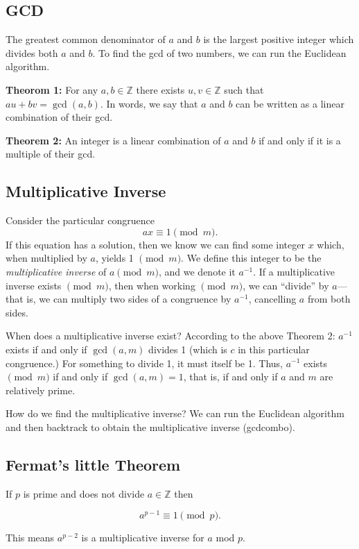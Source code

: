 \documentclass[12pt,letterpaper]{article}
\newcommand\Z{\mathbb Z}
\begin{document}
\subsection{GCD}

The greatest common denominator of $a$ and $b$ is the largest positive integer which divides both $a$ and $b$. To find the gcd of two numbers, we can run the Euclidean algorithm.

\textbf{Theorom 1:} For any $a,b \in \Z$ there exists $u,v \in \Z$ such that $au + bv = \gcd(a,b)$. In words, we say that $a$ and $b$ can be written as a linear combination of their gcd.

\textbf{Theorem 2:} An integer is a linear combination of $a$ and $b$ if and only if it is a multiple of their gcd.

\subsection{Multiplicative Inverse}
Consider the particular congruence
\[
ax \equiv 1 \pmod{m}.
\]
If this equation has a solution, then we know we can find some integer $x$ which, when multiplied by $a$, yields 1 $\pmod{m}$. We define this integer to be the \textit{multiplicative inverse} of $a \pmod{m}$, and we denote it $a^{-1}$. If a multiplicative inverse exists $\pmod{m}$, then when working $\pmod{m}$, we can ``divide'' by $a$---that is, we can multiply two sides of a congruence by $a^{-1}$, cancelling $a$ from both sides.

When does a multiplicative inverse exist? According to the above Theorem 2: $a^{-1}$ exists if and only if $\gcd(a,m)$ divides 1 (which is $c$ in this particular congruence.) For something to divide 1, it must itself be 1. Thus, $a^{-1}$ exists $\pmod{m}$ if and only if $\gcd(a,m) = 1$, that is, if and only if $a$ and $m$ are relatively prime.

How do we find the multiplicative inverse? We can run the Euclidean algorithm and then backtrack to obtain the multiplicative inverse (gcdcombo).
		
\subsection{Fermat's \tiny{little} Theorem}

If $p$ is prime and does not divide $a \in \Z$ then

\[
a^{p-1} \equiv 1 \pmod{p}.
\]

This means $a^{p-2}$ is a multiplicative inverse for $a$ mod $p$.
\end{document}
